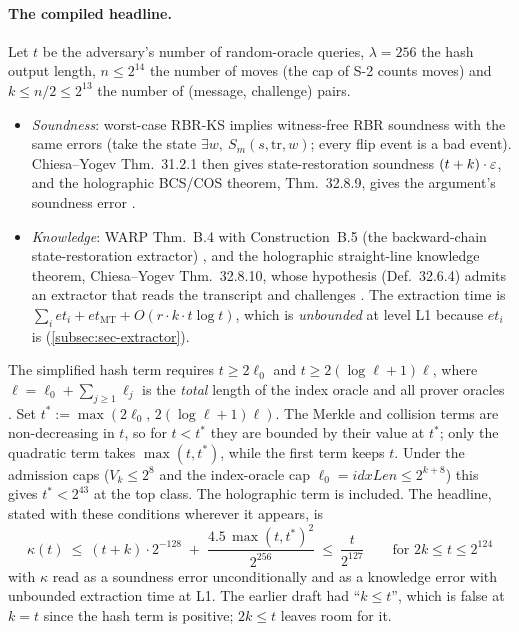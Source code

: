 \paragraph{The compiled headline.} Let $t$ be the adversary's number of random-oracle queries,
$\lambda=256$ the hash output length, $n\le2^{14}$ the number of moves (the  cap of
S-2 counts moves) and $k\le n/2\le2^{13}$ the number of (message, challenge) pairs.
\begin{itemize}[nosep]
\item \emph{Soundness}: worst-case RBR-KS implies witness-free RBR soundness with the same errors
  (take the state $\exists w,\ S_m(s,\mathrm{tr},w)$; every flip event is a bad event). Chiesa--Yogev
  Thm.~31.2.1 then gives state-restoration soundness $(t+k)\cdot\varepsilon$, and the holographic BCS/COS
  theorem, Thm.~32.8.9, gives the argument's soundness error \cite{CY24-Book}.
\item \emph{Knowledge}: WARP Thm.~B.4 with Construction~B.5 (the backward-chain state-restoration
  extractor) \cite{BCFW25-WARP}, and the holographic straight-line knowledge theorem, Chiesa--Yogev
  Thm.~32.8.10, whose hypothesis (Def.~32.6.4) admits an extractor that reads the transcript and
  challenges \cite{CY24-Book}. The extraction time is
  $\sum_i\mathit{et}_i+\mathit{et}_{\mathrm{MT}}+O(r\cdot k\cdot t\log t)$, which is
  \emph{unbounded} at level L1 because $\mathit{et}_i$ is (\cref{subsec:sec-extractor}).
\end{itemize}
The simplified hash term requires $t\ge 2\ell_0$ and $t\ge 2(\log\ell+1)\ell$, where
$\ell=\ell_0+\sum_{j\ge1}\ell_j$ is the \emph{total} length of the index oracle and all prover
oracles \cite[Thm.~32.8.9]{CY24-Book}. Set $t^*:=\max(2\ell_0,\,2(\log\ell+1)\ell)$. The Merkle
and collision terms are non-decreasing in $t$, so for $t<t^*$ they are bounded by their value at
$t^*$; only the quadratic term takes $\max(t,t^*)$, while the first term keeps $t$. Under the
admission caps ($V_k\le2^8$ and the index-oracle cap $\ell_0=\mathit{idxLen}\le2^{k+8}$) this gives
$t^*<2^{43}$ at the top class. The holographic term is included. The headline, stated with these conditions
wherever it appears, is
\[ \boxed{\ \kappa(t)\ \le\ (t+k)\cdot 2^{-128}\;+\;\frac{4.5\,\max(t,t^*)^2}{2^{256}}
   \ \le\ \frac{t}{2^{127}}\qquad\text{for } 2k\le t\le 2^{124}\ } \]
\noindent with $\kappa$ read as a soundness error unconditionally and as a knowledge error with
unbounded extraction time at L1. The earlier draft had \enquote{$k\le t$}, which is false at $k=t$
since the hash term is positive; $2k\le t$ leaves room for it.

